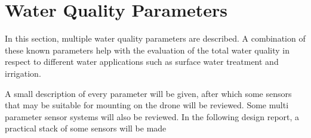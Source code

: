 \newpage
\section{Water Quality Parameters} \label{variables}
In this section, multiple water quality parameters are described. A combination of these known parameters help with the evaluation of the total water quality in respect to different water applications such as surface water treatment and irrigation.

A small description of every parameter will be given, after which some sensors that may be suitable for mounting on the drone will be reviewed. Some multi parameter sensor systems will also be reviewed. In the following design report, a practical stack of some sensors will be made

%








